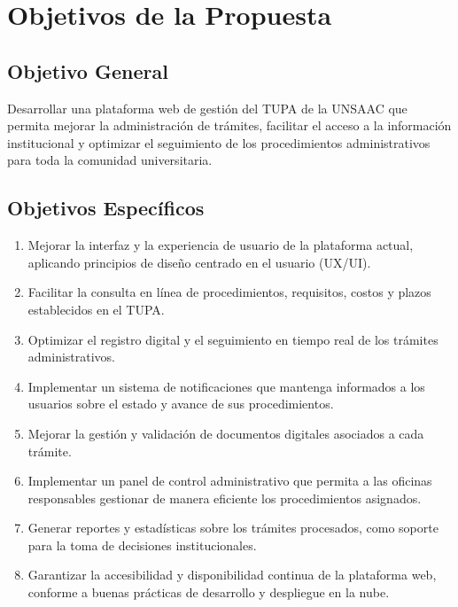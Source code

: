 \section{Objetivos de la Propuesta}

\subsection{Objetivo General}

Desarrollar una plataforma web de gestión del TUPA de la UNSAAC que permita mejorar
la administración de trámites, facilitar el acceso a la información institucional y
optimizar el seguimiento de los procedimientos administrativos para toda la comunidad
universitaria.

\subsection{Objetivos Específicos}

\begin{enumerate}
  \item Mejorar la interfaz y la experiencia de usuario de la plataforma actual,
        aplicando principios de diseño centrado en el usuario (UX/UI).

  \item Facilitar la consulta en línea de procedimientos, requisitos, costos y plazos
        establecidos en el TUPA.

  \item Optimizar el registro digital y el seguimiento en tiempo real de los trámites
        administrativos.

  \item Implementar un sistema de notificaciones que mantenga informados a los usuarios
        sobre el estado y avance de sus procedimientos.

  \item Mejorar la gestión y validación de documentos digitales asociados a cada
        trámite.

  \item Implementar un panel de control administrativo que permita a las oficinas
        responsables gestionar de manera eficiente los procedimientos asignados.

  \item Generar reportes y estadísticas sobre los trámites procesados, como soporte
        para la toma de decisiones institucionales.

  \item Garantizar la accesibilidad y disponibilidad continua de la plataforma web,
        conforme a buenas prácticas de desarrollo y despliegue en la nube.
\end{enumerate}
